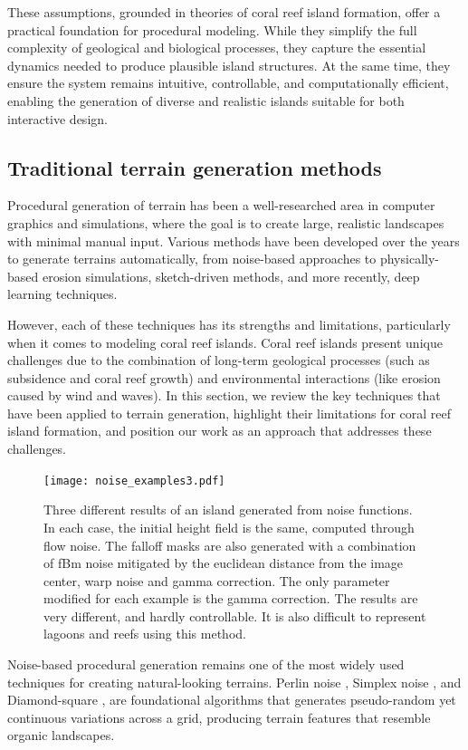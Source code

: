 These assumptions, grounded in theories of coral reef island formation, offer a practical foundation for procedural modeling. While they simplify the full complexity of geological and biological processes, they capture the essential dynamics needed to produce plausible island structures. At the same time, they ensure the system remains intuitive, controllable, and computationally efficient, enabling the generation of diverse and realistic islands suitable for both interactive design.





\subsection{Traditional terrain generation methods}
\label{sec:coral-island_sota-traditional}

Procedural generation of terrain has been a well-researched area in computer graphics and simulations, where the goal is to create large, realistic landscapes with minimal manual input. Various methods have been developed over the years to generate terrains automatically, from noise-based approaches to physically-based erosion simulations, sketch-driven methods, and more recently, deep learning techniques.

However, each of these techniques has its strengths and limitations, particularly when it comes to modeling coral reef islands. Coral reef islands present unique challenges due to the combination of long-term geological processes (such as subsidence and coral reef growth) and environmental interactions (like erosion caused by wind and waves). In this section, we review the key techniques that have been applied to terrain generation, highlight their limitations for coral reef island formation, and position our work as an approach that addresses these challenges.


\begin{figure}[ht]
    \centering
    \texttt{[image: noise\_examples3.pdf]}
    \caption{Three different results of an island generated from noise functions. In each case, the initial height field is the same, computed through flow noise. The falloff masks are also generated with a combination of fBm noise mitigated by the euclidean distance from the image center, warp noise and gamma correction. The only parameter modified for each example is the gamma correction. The results are very different, and hardly controllable. It is also difficult to represent lagoons and reefs using this method.}
    \label{fig:coral-island_noise-example}
\end{figure}
Noise-based procedural generation remains one of the most widely used techniques for creating natural-looking terrains. Perlin noise \cite{Perlin1985}, Simplex noise \cite{Perlin2001}, and Diamond-square \cite{Fournier1982}, are foundational algorithms that generates pseudo-random yet continuous variations across a grid, producing terrain features that resemble organic landscapes.

